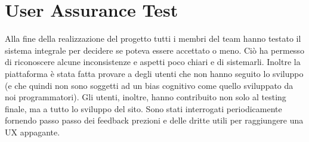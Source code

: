 \section{User Assurance Test}

Alla fine della realizzazione del progetto tutti i membri del team hanno testato il sistema integrale per decidere se poteva essere accettato o meno. Ciò ha permesso di riconoscere alcune inconsistenze e aspetti poco chiari e di sistemarli. Inoltre la piattaforma è stata fatta provare a degli utenti che non hanno seguito lo sviluppo (e che quindi non sono soggetti ad un bias cognitivo come quello sviluppato da noi programmatori). Gli utenti, inoltre, hanno contribuito non solo al testing finale, ma a tutto lo sviluppo del sito. Sono stati interrogati periodicamente fornendo passo passo dei feedback prezioni e delle dritte utili per raggiungere una UX appagante.